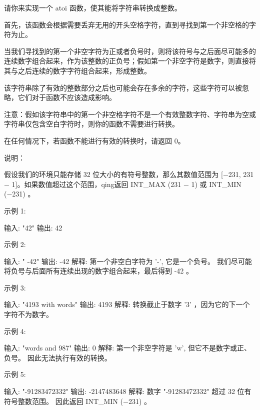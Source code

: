 请你来实现一个 atoi 函数，使其能将字符串转换成整数。

首先，该函数会根据需要丢弃无用的开头空格字符，直到寻找到第一个非空格的字符为止。

当我们寻找到的第一个非空字符为正或者负号时，则将该符号与之后面尽可能多的连续数字组合起来，作为该整数的正负号；假如第一个非空字符是数字，则直接将其与之后连续的数字字符组合起来，形成整数。

该字符串除了有效的整数部分之后也可能会存在多余的字符，这些字符可以被忽略，它们对于函数不应该造成影响。

注意：假如该字符串中的第一个非空格字符不是一个有效整数字符、字符串为空或字符串仅包含空白字符时，则你的函数不需要进行转换。

在任何情况下，若函数不能进行有效的转换时，请返回 0。

说明：

假设我们的环境只能存储 32 位大小的有符号整数，那么其数值范围为 [−231,  231 − 1]。如果数值超过这个范围，qing返回  INT_MAX (231 − 1) 或 INT_MIN (−231) 。

示例 1:

输入: "42"
输出: 42

示例 2:

输入: "   -42"
输出: -42
解释: 第一个非空白字符为 '-', 它是一个负号。
     我们尽可能将负号与后面所有连续出现的数字组合起来，最后得到 -42 。

示例 3:

输入: "4193 with words"
输出: 4193
解释: 转换截止于数字 '3' ，因为它的下一个字符不为数字。

示例 4:

输入: "words and 987"
输出: 0
解释: 第一个非空字符是 'w', 但它不是数字或正、负号。
     因此无法执行有效的转换。

示例 5:

输入: "-91283472332"
输出: -2147483648
解释: 数字 "-91283472332" 超过 32 位有符号整数范围。 
     因此返回 INT_MIN (−231) 。


































